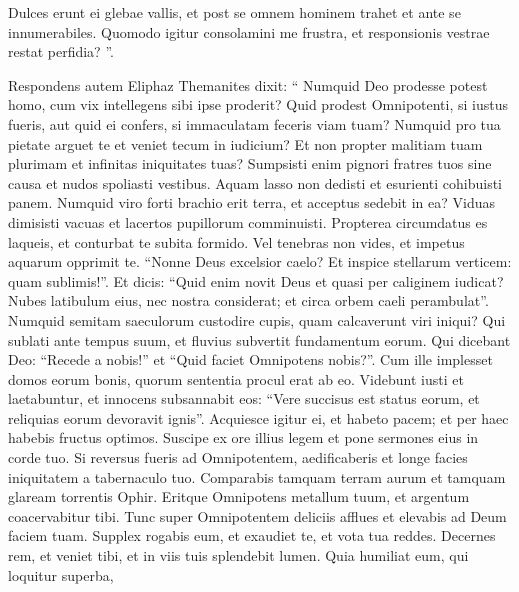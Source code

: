 \begin{biblechapter}
\begin{biblechapter}
\begin{biblechapter}
\begin{biblechapter}
\begin{biblechapter}
\begin{biblechapter}
\begin{biblechapter}
\begin{biblechapter}
\begin{biblechapter}
\begin{biblechapter}
\begin{biblechapter}
\begin{biblechapter}
\begin{biblechapter}
\begin{biblechapter}
\begin{biblechapter}
\begin{biblechapter}
\begin{biblechapter}
\begin{biblechapter}
\begin{biblechapter}
\begin{biblechapter}
\begin{biblechapter}
 \verse Dulces erunt ei glebae vallis,
 et post se omnem hominem trahet
 et ante se innumerabiles.
 \verse Quomodo igitur consolamini me frustra,
 et responsionis vestrae restat perfidia? ”.
 
\begin{biblechapter}
\verse Respondens autem Eliphaz Themanites dixit:
 \verse “ Numquid Deo prodesse potest homo,
 cum vix intellegens sibi ipse proderit?
 \verse Quid prodest Omnipotenti, si iustus fueris,
 aut quid ei confers, si immaculatam feceris viam tuam?
 \verse Numquid pro tua pietate arguet te
 et veniet tecum in iudicium?
 \verse Et non propter malitiam tuam plurimam
 et infinitas iniquitates tuas?
 \verse Sumpsisti enim pignori fratres tuos sine causa
 et nudos spoliasti vestibus.
 \verse Aquam lasso non dedisti
 et esurienti cohibuisti panem.
 \verse Numquid viro forti brachio erit terra,
 et acceptus sedebit in ea?
 \verse Viduas dimisisti vacuas
 et lacertos pupillorum comminuisti. 
\verse Propterea circumdatus es laqueis,
 et conturbat te subita formido.
 \verse Vel tenebras non vides,
 et impetus aquarum opprimit te.
 \verse “Nonne Deus excelsior caelo?
 Et inspice stellarum verticem: quam sublimis!”.
 \verse Et dicis: “Quid enim novit Deus
 et quasi per caliginem iudicat?
 \verse Nubes latibulum eius, nec nostra considerat;
 et circa orbem caeli perambulat”.
 \verse Numquid semitam saeculorum custodire cupis,
 quam calcaverunt viri iniqui?
 \verse Qui sublati ante tempus suum,
 et fluvius subvertit fundamentum eorum.
 \verse Qui dicebant Deo: “Recede a nobis!”
 et “Quid faciet Omnipotens nobis?”.
 \verse Cum ille implesset domos eorum bonis,
 quorum sententia procul erat ab eo.
 \verse Videbunt iusti et laetabuntur,
 et innocens subsannabit eos:
 \verse “Vere succisus est status eorum,
 et reliquias eorum devoravit ignis”. 
\verse Acquiesce igitur ei, et habeto pacem;
 et per haec habebis fructus optimos.
 \verse Suscipe ex ore illius legem
 et pone sermones eius in corde tuo.
 \verse Si reversus fueris ad Omnipotentem, aedificaberis
 et longe facies iniquitatem a tabernaculo tuo.
 \verse Comparabis tamquam terram aurum
 et tamquam glaream torrentis Ophir.
 \verse Eritque Omnipotens metallum tuum,
 et argentum coacervabitur tibi.
 \verse Tunc super Omnipotentem deliciis afflues
 et elevabis ad Deum faciem tuam. 
\verse Supplex rogabis eum, et exaudiet te,
 et vota tua reddes.
 \verse Decernes rem, et veniet tibi,
 et in viis tuis splendebit lumen.
 \verse Quia humiliat eum, qui loquitur superba,

\end{biblechapter}
\end{biblechapter}
\end{biblechapter}
\end{biblechapter}
\end{biblechapter}
\end{biblechapter}
\end{biblechapter}
\end{biblechapter}
\end{biblechapter}
\end{biblechapter}
\end{biblechapter}
\end{biblechapter}
\end{biblechapter}
\end{biblechapter}
\end{biblechapter}
\end{biblechapter}
\end{biblechapter}
\end{biblechapter}
\end{biblechapter}
\end{biblechapter}
\end{biblechapter}
\end{biblechapter}
